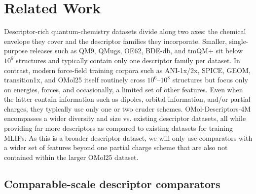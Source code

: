 \section{Related Work}
\label{sec:related}

Descriptor-rich quantum-chemistry datasets divide along two axes: the
chemical envelope they cover and the descriptor families they incorporate.
Smaller, single-purpose releases such as QM9, QMugs, OE62, BDE-db, and
tmQM+ \citep{qm9, qmugs, oe62, bdedb, D5DD00220F} sit below $10^{6}$
structures and typically contain only one descriptor family per dataset.
In contrast, modern force-field training corpora such as ANI-1x/2x, SPICE, GEOM,
transition1x, and OMol25 itself \citep{ani1x, ani2x, spice, geom,
transition1x, levine2026openmolecules2025omol25} routinely
cross $10^{6}$--$10^{8}$ structures but focus only on energies, forces, and
occasionally, a limited set of other features. Even when the latter contain information such as dipoles,
orbital information, and/or partial charges, they typically use only one or two cruder schemes.
OMol-Descriptors-4M encompasses a wider diversity and size vs. existing descriptor datasets, all 
while providing far more descriptors as compared to existing datasets for training MLIPs. 
As this is a broader descriptor dataset, we will only use comparators with a wider 
set of features beyond one partial charge scheme that are also not contained within the 
larger OMol25 dataset. 


\subsection{Comparable-scale descriptor comparators}
\label{sec:related-comparators}

